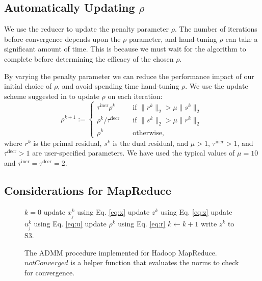 \documentclass[10pt, conference, compsocconf]{IEEEtran}
\begin{document}
\subsection{Automatically Updating $\rho$}

We use the reducer to update the penalty parameter $\rho$.  The number of iterations before convergence depends upon the $\rho$ parameter, and hand-tuning $\rho$ can take a significant amount of time.  This is because we must wait for the algorithm to complete before determining the efficacy of the chosen $\rho$.

By varying the penalty parameter we can reduce the performance impact of our initial choice of $\rho$, and avoid spending time hand-tuning $\rho$.  We use the update scheme suggested in \cite{boyd} to update $\rho$ on each iteration:
\begin{equation}
\rho^{k+1}:=\begin{cases}
  \tau^{\text{incr}}\rho^k&\quad \text{if $\|r^k\|_2>\mu\|s^k\|_2$}\\
  \rho^k/\tau^{\text{decr}}&\quad \text{if $\|s^k\|_2>\mu\|r^k\|_2$}\\
  \rho^k&\quad \text{otherwise,}
\end{cases}
\label{eq:r}
\end{equation}
where $r^k$ is the primal residual, $s^k$ is the dual residual, and $\mu>1$, $\tau^{\text{incr}}>1$, and $\tau^{\text{decr}}>1$ are user-specified parameters.  We have used the typical values of $\mu=10$ and $\tau^{\text{incr}}=\tau^{\text{decr}}=2$.

\subsection{Considerations for MapReduce}
\begin{figure}
\begin{algorithmic}[1]
  \State $k=0$
  \label{alg:while}
    \label{alg:startInner}
      \State update $x_{_j}^k$ using Eq. \ref{eq:x}
    \EndFor
    \State update $z^k$ using Eq. \ref{eq:z}
       \State update $u_{_j}^k$ using Eq. \ref{eq:u}
    \EndFor
    \State update $\rho^k$ using Eq. \ref{eq:r}
    \State $k \gets k + 1$\label{alg:endInner}
  \EndWhile
  \State write $z^k$ to S3.\label{alg:output}
\EndProcedure
\end{algorithmic}
\caption{The ADMM procedure implemented for Hadoop MapReduce.  $notConverged$ is a helper function that evaluates the norms to check for convergence.}
\label{alg:admm}
\end{figure}
\end{document}
